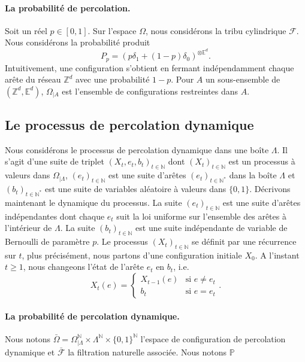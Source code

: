 \documentclass[titlepage,a4paper,12pt]{article}
\newcounter{th}
\begin{document}
\paragraph{La probabilité de percolation.} Soit un réel $p\in [0,1]$. Sur l'espace $\Omega$, nous considérons la tribu cylindrique $\mathcal{F}$. Nous considérons la probabilité produit $$P_p = (p\delta_1 +(1-p)\delta_0)^{\otimes\mathbb{E}^d}.$$ Intuitivement, une configuration s'obtient en fermant indépendamment chaque arête du réseau $\mathbb{Z}^d$ avec une probabilité $1-p$. Pour $A$ un sous-ensemble de $(\mathbb{Z}^d,\mathbb{E}^d)$, $\Omega_{|A}$ est l'ensemble de configurations restreintes dans $A$.
\subsection{Le processus de percolation dynamique}
Nous considérons le processus de percolation dynamique dans une boîte $\Lambda$. Il s'agit d'une suite de triplet $(X_t,e_t,b_t)_{t\in \mathbb{N}}$ dont $(X_t)_{t\in\mathbb{N}}$ est un processus à valeurs dans $\Omega_{|\Lambda}$, $(e_t)_{t\in\mathbb{N}}$ est une suite d'arêtes $(e_t)_{t\in \mathbb{N}^*}$ dans la boîte $\Lambda$ et $(b_t)_{t\in \mathbb{N}^*}$ est une suite de variables aléatoire à valeurs dans $\{0,1\}$. Décrivons maintenant le dynamique du processus. La suite $(e_t)_{t\in\mathbb{N}}$ est une suite d'arêtes indépendantes dont chaque $e_t$ suit la loi uniforme sur l'ensemble des arêtes à l'intérieur de $\Lambda$. La suite $(b_t)_{t\in\mathbb{N}}$ est une suite indépendante de variable de Bernoulli de paramètre $p$. Le processus $(X_t)_{t\in\mathbb{N}}$ se définit par une récurrence sur $t$, plus précisément, nous partons d'une configuration initiale $X_0$. A l'instant $t\geqslant 1$, nous changeons l'état de l'arête $e_t$ en $b_t$, i.e.
$$ X_t(e) = \left\lbrace \begin{array}{cc}
X_{t-1}(e) & \text{si }e\neq e_t \\
b_{t} & \text{si } e = e_t
\end{array} \right..
$$ 

\paragraph{La probabilité de percolation dynamique.}
Nous notons $\bar{\Omega} = \Omega_{|\Lambda}^\mathbb{N}\times \Lambda^\mathbb{N}\times\{0,1\}^\mathbb{N}$ l'espace de configuration de percolation dynamique et $\bar{\mathcal{F}}$ la filtration naturelle associée. Nous notons $\mathbb{P}$
\end{document}
